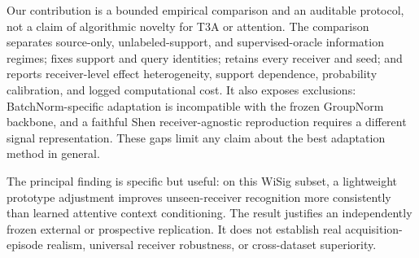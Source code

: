 Our contribution is a bounded empirical comparison and an auditable protocol, not a claim of algorithmic novelty for T3A or attention. The comparison separates source-only, unlabeled-support, and supervised-oracle information regimes; fixes support and query identities; retains every receiver and seed; and reports receiver-level effect heterogeneity, support dependence, probability calibration, and logged computational cost. It also exposes exclusions: BatchNorm-specific adaptation is incompatible with the frozen GroupNorm backbone, and a faithful Shen receiver-agnostic reproduction requires a different signal representation. These gaps limit any claim about the best adaptation method in general.

The principal finding is specific but useful: on this WiSig subset, a lightweight prototype adjustment improves unseen-receiver recognition more consistently than learned attentive context conditioning. The result justifies an independently frozen external or prospective replication. It does not establish real acquisition-episode realism, universal receiver robustness, or cross-dataset superiority.

